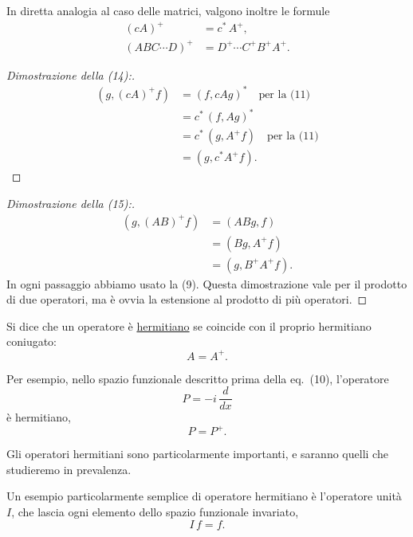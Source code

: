 \documentclass[11pt, a4paper]{book}
\numberwithin{equation}{section}
\begin{document}
In diretta analogia al caso delle matrici, valgono inoltre le formule
\begin{align}
(cA)^+ &= c^*\,A^+, \tag{14} \\
(ABC\cdots D)^+ &= D^+\cdots C^+B^+A^+. \tag{15}
\end{align}

\begin{proof}[Dimostrazione della (14):]
\begin{align*}
(g, (cA)^+f) &= (f, cAg)^* \quad \text{per la (11)} \\
  &= c^*\,(f, Ag)^* \\
  &= c^*\,(g, A^+f) \quad \text{per la (11)} \\
  &= (g, c^*A^+f).
\end{align*}
\end{proof}


\begin{proof}[Dimostrazione della (15):]
\begin{align*}
(g, (AB)^+f) &= (ABg, f) \\
  &= (Bg, A^+f) \\
  &= (g, B^+A^+f).
\end{align*}
In ogni passaggio abbiamo usato la (9). Questa dimostrazione vale per il
prodotto di due operatori, ma è ovvia la estensione al prodotto di più
operatori.
\end{proof}

Si dice che un operatore è \underline{hermitiano} se coincide con il
proprio hermitiano coniugato:
\begin{equation}
A = A^+.
\end{equation}

Per esempio, nello spazio funzionale descritto prima della eq.\ (10),
l'operatore
\begin{equation}
P = -i\,\frac{d}{dx}
\end{equation}
è hermitiano,
\begin{equation}
P = P^+.
\end{equation}

Gli operatori hermitiani sono particolarmente importanti, e saranno
quelli che studieremo in prevalenza.

Un esempio particolarmente semplice di operatore hermitiano è
l'operatore unità $I$, che lascia ogni elemento dello spazio funzionale
invariato,
\begin{equation}
I\,f = f.
\end{equation}
\end{document}
